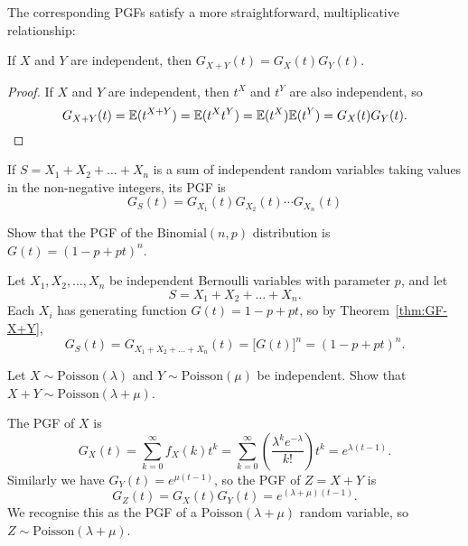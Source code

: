 The corresponding PGFs satisfy a more straightforward, multiplicative relationship:

\newpage
\begin{theorem}\label{thm:GF-X+Y}
If $X$ and $Y$ are independent, then $G_{X+Y}(t) = G_X(t)G_Y(t)$.
\end{theorem}
\begin{proof}
If $X$ and $Y$ are independent, then $t^X$ and $t^Y$ are also independent, so 
\[
G_{X+Y}(t) = \mathbb{E}(t^{X+Y}) = \mathbb{E}(t^X t^Y) = \mathbb{E}(t^X)\mathbb{E}(t^Y) = G_X(t)G_Y(t).
\]
\end{proof}

\begin{corollary}
If $S=X_1+X_2+\ldots+X_n$ is a sum of independent random variables taking values in the non-negative integers, its PGF is 
\[
G_S(t) = G_{X_1}(t)G_{X_2}(t)\cdots G_{X_n}(t)
\]
\end{corollary}

\begin{example}
Show that the PGF of the $\text{Binomial}(n,p)$ distribution is $G(t)=(1-p+pt)^n$.
\end{example}
\begin{solution}
Let $X_1,X_2,\ldots,X_n$ be independent Bernoulli variables with parameter $p$, and let 
\[
S = X_1 + X_2 + \ldots + X_n.
\]
Each $X_i$ has generating function $G(t) = 1 - p + pt$, so by Theorem~\ref{thm:GF-X+Y},
\[
G_S(t) = G_{X_1+X_2+\ldots+X_n}(t) = \big[G(t)\big]^n = (1 - p + pt)^n.
\]
\end{solution}

\begin{example}
Let $X\sim\text{Poisson}(\lambda)$ and $Y\sim\text{Poisson}(\mu)$ be independent. Show that $X+Y\sim\text{Poisson}(\lambda+\mu)$.
\end{example}
\begin{solution}
The PGF of $X$ is 
\[
G_X(t) 
	= \sum_{k=0}^{\infty} f_X(k) t^k
	= \sum_{k=0}^{\infty}\left(\frac{\lambda^k e^{-\lambda}}{k!}\right)t^k
	= e^{\lambda(t-1)}.
\]
Similarly we have $G_Y(t) = e^{\mu(t-1)}$, so the PGF of $Z=X+Y$ is 
\[
G_Z(t) = G_X(t)G_Y(t) = e^{(\lambda+\mu)(t-1)}.
\]
We recognise this as the PGF of a $\text{Poisson}(\lambda+\mu)$ random variable, so $Z\sim\text{Poisson}(\lambda+\mu)$.
\end{solution}

